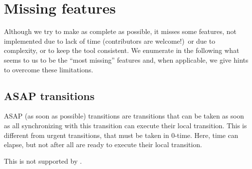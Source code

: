 \begin{multicols}{2}
	 \\
	 \\
	 \\
	 \\
	 \\
	 \\
	 \\
	 \\
	 \\
	 \\
	 \\
	 \\
\end{multicols}


\chapter{Missing features}

Although we try to make \imitator{} as complete as possible, it misses some features, not implemented due to lack of time (contributors are welcome!)\ or due to complexity, or to keep the tool consistent.
We enumerate in the following what seems to us to be the ``most missing'' features and, when applicable, we give hints to overcome these limitations.



\section{ASAP transitions}

ASAP (as soon as possible) transitions are transitions that can be taken as soon as all \IPTA{} synchronizing with this transition can execute their local transition.
This is different from urgent transitions, that must be taken in 0-time.
Here, time can elapse, but not after all \IPTA{} are ready to execute their local transition.

This is not supported by \imitator{}. %




